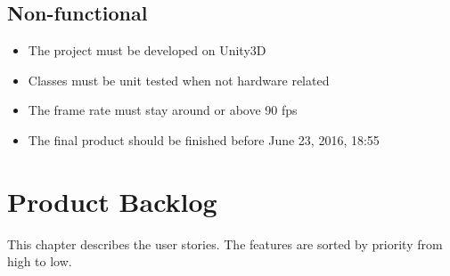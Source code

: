 \documentclass[11pt,a4paper]{report}
\begin{document}
\section{Non-functional}
\begin{itemize}
\item The project must be developed on Unity3D
\item Classes must be unit tested when not hardware related
\item The frame rate must stay around or above 90 fps
\item The final product should be finished before June 23, 2016, 18:55
\end{itemize}

\chapter{Product Backlog}
This chapter describes the user stories. The features are sorted by priority from high to low.
\end{document}
